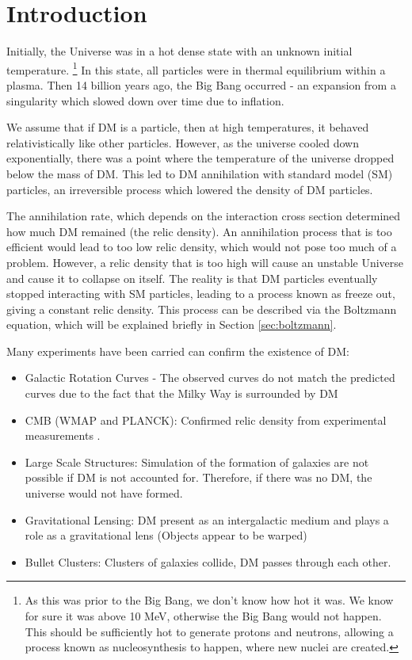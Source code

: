 \documentclass[12pt]{article}
\begin{document}
\newpage

\onehalfspacing
\setcounter{page}{1}
\section{Introduction}
\label{sec:introduction}
Initially, the Universe was in a hot dense state with an unknown initial temperature. \footnote{As this was prior to the Big Bang, we don't know how hot it was. We know for sure it was above 10 MeV, otherwise the Big Bang would not happen. This should be sufficiently hot to generate protons and neutrons, allowing a process known as nucleosynthesis to happen, where new nuclei are created.} In this state, all particles were in thermal equilibrium within a plasma. Then 14 billion years ago, the Big Bang occurred - an expansion from a singularity which slowed down over time due to inflation.

We assume that if DM is a particle, then at high temperatures, it behaved relativistically like other particles. However, as the universe cooled down exponentially, there was a point where the temperature of the universe dropped below the mass of DM. This led to DM annihilation with standard model (SM) particles, an irreversible process which lowered the density of DM particles. 

The annihilation rate, which depends on the interaction cross section determined how much DM remained (the relic density). An annihilation process that is too efficient would lead to too low relic density, which would not pose too much of a problem. However, a relic density that is too high will cause an unstable Universe and cause it to collapse on itself. The reality is that DM particles eventually stopped interacting with SM particles, leading to a process known as freeze out, giving a constant relic density. This process can be described via the Boltzmann equation, which will be explained briefly in Section \ref{sec:boltzmann}.

Many experiments have been carried can confirm the existence of DM:

\begin{itemize}
    \item Galactic Rotation Curves - The observed curves do not match the predicted curves due to the fact that the Milky Way is surrounded by DM
    \item CMB (WMAP and PLANCK): Confirmed relic density from experimental measurements \cite{Planck:2018vyg}.
    \item Large Scale Structures: Simulation of the formation of galaxies are not possible if DM is not accounted for. Therefore, if there was no DM, the universe would not have formed.
    \item Gravitational Lensing: DM present as an intergalactic medium and plays a role as a gravitational lens (Objects appear to be warped)
    \item Bullet Clusters: Clusters of galaxies collide, DM passes through each other.
\end{itemize}
\end{document}
